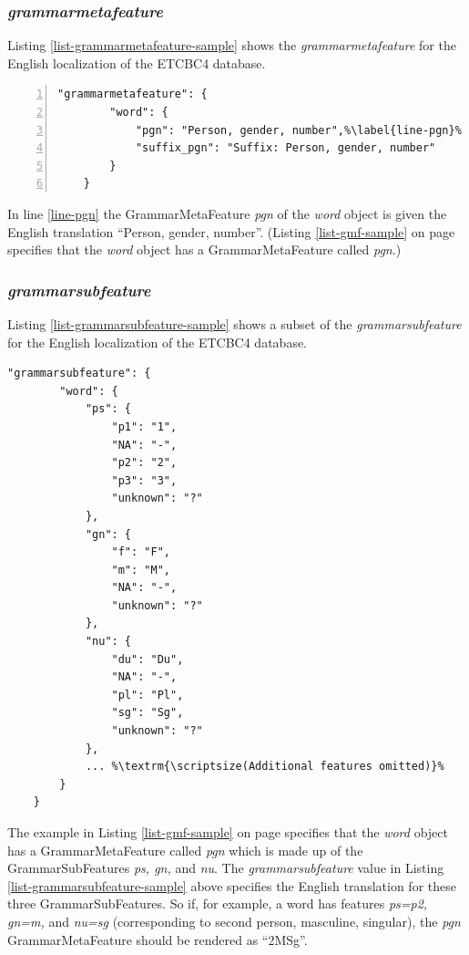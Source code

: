 \documentclass[11pt,oneside,a4paper]{memoir}
\begin{document}
\subsubsection{\emph{grammarmetafeature}}

Listing \ref{list-grammarmetafeature-sample} shows the \emph{grammarmetafeature} for the English
localization of the ETCBC4 database.

\begin{lstlisting}[numbers=left,caption=A sample grammarmetafeature value,label=list-grammarmetafeature-sample]
    "grammarmetafeature": {
        "word": {
            "pgn": "Person, gender, number",%\label{line-pgn}%
            "suffix_pgn": "Suffix: Person, gender, number"
        }
    }
\end{lstlisting}

In line \ref{line-pgn} the GrammarMetaFeature \emph{pgn} of the \emph{word} object is given the
English translation ``Person, gender, number''. (Listing \ref{list-gmf-sample} on page
\pageref{list-gmf-sample} specifies that the \emph{word} object has a GrammarMetaFeature called
\emph{pgn}.)

\subsubsection{\emph{grammarsubfeature}}

Listing \ref{list-grammarsubfeature-sample} shows a subset of the \emph{grammarsubfeature} for the
English localization of the ETCBC4 database.

\begin{lstlisting}[caption=A sample grammarsubfeature value,label=list-grammarsubfeature-sample]
    "grammarsubfeature": {
        "word": {
            "ps": {
                "p1": "1",
                "NA": "-",
                "p2": "2",
                "p3": "3",
                "unknown": "?"
            },
            "gn": {
                "f": "F",
                "m": "M",
                "NA": "-",
                "unknown": "?"
            },
            "nu": {
                "du": "Du",
                "NA": "-",
                "pl": "Pl",
                "sg": "Sg",
                "unknown": "?"
            },
            ... %\textrm{\scriptsize(Additional features omitted)}%
        }
    }
\end{lstlisting}

The example in Listing \ref{list-gmf-sample} on page \pageref{list-gmf-sample} specifies that the
\emph{word} object has a GrammarMetaFeature called \emph{pgn} which is made up of the
GrammarSubFeatures \emph{ps, gn,} and \emph{nu}. The \emph{grammarsubfeature} value in Listing
\ref{list-grammarsubfeature-sample} above specifies the English translation for these three
GrammarSubFeatures. So if, for example, a word has features \emph{ps=p2, gn=m,} and \emph{nu=sg}
(corresponding to second person, masculine, singular), the \emph{pgn} GrammarMetaFeature should be
rendered as ``2MSg''.
\end{document}
